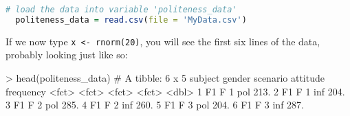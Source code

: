 \documentclass[fleqn,reqno,12pt]{article}
\newcommand{\ri}[1]{\lstinline{#1}}  %
\begin{document}
\begin{lstlisting}[language=R]
  # load the data into variable 'politeness_data'
  politeness_data = read.csv(file = 'MyData.csv')     
\end{lstlisting}

If we now type \ri{x <- rnorm(20)}, you will see the first six lines of the data, probably looking just like so:

\medskip


\begin{rc}
> head(politeness_data)
# A tibble: 6 x 5
  subject gender scenario attitude frequency
  <fct>   <fct>  <fct>    <fct>        <dbl>
1 F1      F      1        pol           213.
2 F1      F      1        inf           204.
3 F1      F      2        pol           285.
4 F1      F      2        inf           260.
5 F1      F      3        pol           204.
6 F1      F      3        inf           287.
\end{rc}


\printbibliography[heading=bibintoc]
\end{document}
